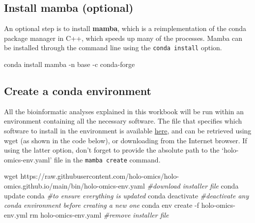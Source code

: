 \documentclass[
]{book}
\newenvironment{Shaded}{\begin{snugshade}}{\end{snugshade}}
\newcommand{\AttributeTok}[1]{\textcolor[rgb]{0.77,0.63,0.00}{#1}}
\newcommand{\CommentTok}[1]{\textcolor[rgb]{0.56,0.35,0.01}{\textit{#1}}}
\newcommand{\ExtensionTok}[1]{#1}
\newcommand{\FunctionTok}[1]{\textcolor[rgb]{0.00,0.00,0.00}{#1}}
\newcommand{\NormalTok}[1]{#1}
\begin{document}
\normalsize

\hypertarget{install-mamba}{%
\subsection*{Install mamba (optional)}\label{install-mamba}}

An optional step is to install \textbf{mamba}, which is a reimplementation of the conda package manager in C++, which speeds up many of the processes. Mamba can be installed through the command line using the \texttt{conda\ install} option.

\small

\begin{Shaded}
\begin{Highlighting}[]
\ExtensionTok{conda}\NormalTok{ install mamba }\AttributeTok{{-}n}\NormalTok{ base }\AttributeTok{{-}c}\NormalTok{ conda{-}forge}
\end{Highlighting}
\end{Shaded}

\normalsize

\hypertarget{create-conda-environment}{%
\subsection*{Create a conda environment}\label{create-conda-environment}}

All the bioinformatic analyses explained in this workbook will be run within an environment containing all the necessary software. The file that specifies which software to install in the environment is available \href{https://raw.githubusercontent.com/holo-omics/holo-omics.github.io/main/bin/holo-omics-env.yaml}{here}, and can be retrieved using wget (as shown in the code below), or downloading from the Internet browser. If using the latter option, don't forget to provide the absolute path to the `holo-omics-env.yaml' file in the \texttt{mamba\ create} command.

\small

\begin{Shaded}
\begin{Highlighting}[]
\FunctionTok{wget}\NormalTok{ https://raw.githubusercontent.com/holo{-}omics/holo{-}omics.github.io/main/bin/holo{-}omics{-}env.yaml }\CommentTok{\#download installer file}
\ExtensionTok{conda}\NormalTok{ update conda }\CommentTok{\#to ensure everything is updated}
\ExtensionTok{conda}\NormalTok{ deactivate }\CommentTok{\#deactivate any conda environment before creating a new one}
\ExtensionTok{conda}\NormalTok{ env create }\AttributeTok{{-}f}\NormalTok{ holo{-}omics{-}env.yml}
\FunctionTok{rm}\NormalTok{ holo{-}omics{-}env.yaml }\CommentTok{\#remove installer file}
\end{Highlighting}
\end{Shaded}
\end{document}
